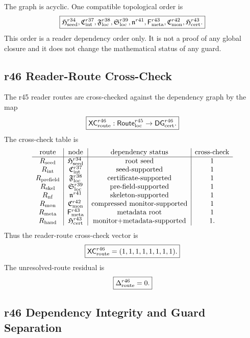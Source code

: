 The graph is acyclic.  One compatible topological order is
\[
\boxed{
\mathfrak H_{\rm seed}^{r34},
\mathfrak C_{\rm int}^{r37},
\mathfrak F_{\rm loc}^{r38},
\mathfrak S_{\rm loc}^{r39},
\mathfrak n^{r41},
\mathsf F_{\rm meta}^{r43},
\mathfrak C_{\rm mon}^{r42},
\mathfrak H_{\rm cert}^{r43}.
}
\]
This order is a reader dependency order only.  It is not a proof of any global
closure and it does not change the mathematical status of any guard.

\subsection{r46 Reader-Route Cross-Check}
\label{subsec:r46-reader-route-crosscheck}

The r45 reader routes are cross-checked against the dependency graph by the map
\[
\boxed{
\mathsf{XC}_{\rm route}^{r46}:
\mathsf{Route}_{\rm loc}^{r45}\to\mathsf{DG}_{\rm cert}^{r46}.
}
\]
The cross-check table is
\[
\begin{array}{c|c|c|c}
\text{route} & \text{node} & \text{dependency status} & \text{cross-check}\\
\hline
R_{\rm seed} & \mathfrak H_{\rm seed}^{r34} & \text{root seed} & 1\\
R_{\rm int} & \mathfrak C_{\rm int}^{r37} & \text{seed-supported} & 1\\
R_{\rm prefield} & \mathfrak F_{\rm loc}^{r38} & \text{certificate-supported} & 1\\
R_{\rm skel} & \mathfrak S_{\rm loc}^{r39} & \text{pre-field-supported} & 1\\
R_{\rm nf} & \mathfrak n^{r41} & \text{skeleton-supported} & 1\\
R_{\rm mon} & \mathfrak C_{\rm mon}^{r42} & \text{compressed monitor-supported} & 1\\
R_{\rm meta} & \mathsf F_{\rm meta}^{r43} & \text{metadata root} & 1\\
R_{\rm hand} & \mathfrak H_{\rm cert}^{r43} & \text{monitor+metadata-supported} & 1.
\end{array}
\]
Thus the reader-route cross-check vector is
\[
\boxed{
\mathsf{XC}_{\rm route}^{r46}
=
(1,1,1,1,1,1,1,1).
}
\]
The unresolved-route residual is
\[
\boxed{
\Delta_{\rm route}^{r46}=0.
}
\]

\subsection{r46 Dependency Integrity and Guard Separation}
\label{subsec:r46-dependency-integrity-guard-separation}

